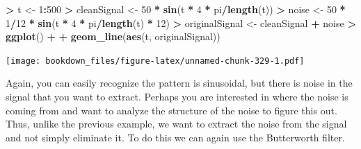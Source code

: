 \documentclass[
]{krantz}
\makeatletter
\newenvironment{Shaded}{\begin{snugshade}}{\end{snugshade}}
\newcommand{\DecValTok}[1]{\textcolor[rgb]{0.06,0.06,0.06}{#1}}
\newcommand{\KeywordTok}[1]{\textcolor[rgb]{0.27,0.27,0.27}{\textbf{#1}}}
\newcommand{\NormalTok}[1]{#1}
\newcommand{\OperatorTok}[1]{\textcolor[rgb]{0.43,0.43,0.43}{\textbf{#1}}}
\newcommand{\StringTok}[1]{\textcolor[rgb]{0.5,0.5,0.5}{#1}}
\newenvironment{kframe}{%
\medskip{}
\setlength{\fboxsep}{.8em}
 \def\at@end@of@kframe{}%
 \ifinner\ifhmode%
  \def\at@end@of@kframe{\end{minipage}}%
  \begin{minipage}{\columnwidth}%
 \fi\fi%
 \def\FrameCommand##1{\hskip\@totalleftmargin \hskip-\fboxsep
 \colorbox{shadecolor}{##1}\hskip-\fboxsep
     \hskip-\linewidth \hskip-\@totalleftmargin \hskip\columnwidth}%
 \MakeFramed {\advance\hsize-\width
   \@totalleftmargin\z@ \linewidth\hsize
   \@setminipage}}%
 {\par\unskip\endMakeFramed%
 \at@end@of@kframe}
\renewenvironment{Shaded}{\begin{kframe}}{\end{kframe}}
\makeatother
\begin{document}
\begin{Shaded}
\begin{Highlighting}[]
\OperatorTok{\textgreater{}}\StringTok{ }\NormalTok{t \textless{}{-}}\StringTok{ }\DecValTok{1}\OperatorTok{:}\DecValTok{500}
\OperatorTok{\textgreater{}}\StringTok{ }\NormalTok{cleanSignal \textless{}{-}}\StringTok{ }\DecValTok{50} \OperatorTok{*}\StringTok{ }\KeywordTok{sin}\NormalTok{(t }\OperatorTok{*}\StringTok{ }\DecValTok{4} \OperatorTok{*}\StringTok{ }\NormalTok{pi}\OperatorTok{/}\KeywordTok{length}\NormalTok{(t))}
\OperatorTok{\textgreater{}}\StringTok{ }\NormalTok{noise \textless{}{-}}\StringTok{ }\DecValTok{50} \OperatorTok{*}\StringTok{ }\DecValTok{1}\OperatorTok{/}\DecValTok{12} \OperatorTok{*}\StringTok{ }\KeywordTok{sin}\NormalTok{(t }\OperatorTok{*}\StringTok{ }\DecValTok{4} \OperatorTok{*}\StringTok{ }\NormalTok{pi}\OperatorTok{/}\KeywordTok{length}\NormalTok{(t) }\OperatorTok{*}\StringTok{ }\DecValTok{12}\NormalTok{)}
\OperatorTok{\textgreater{}}\StringTok{ }\NormalTok{originalSignal \textless{}{-}}\StringTok{ }\NormalTok{cleanSignal }\OperatorTok{+}\StringTok{ }\NormalTok{noise}
\OperatorTok{\textgreater{}}\StringTok{ }\KeywordTok{ggplot}\NormalTok{() }\OperatorTok{+}\StringTok{ }
\OperatorTok{+}\StringTok{   }\KeywordTok{geom\_line}\NormalTok{(}\KeywordTok{aes}\NormalTok{(t, originalSignal))}
\end{Highlighting}
\end{Shaded}

\texttt{[image: bookdown\_files/figure-latex/unnamed-chunk-329-1.pdf]}

Again, you can easily recognize the pattern is sinusoidal, but there is noise in the signal that you want to extract. Perhaps you are interested in where the noise is coming from and want to analyze the structure of the noise to figure this out. Thus, unlike the previous example, we want to extract the noise from the signal and not simply eliminate it. To do this we can again use the Butterworth filter.
\end{document}
